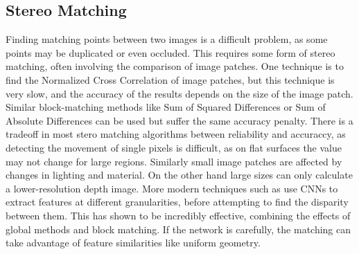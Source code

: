 \documentclass[ %
                    author={Gavin Parker},
                supervisor={Dr. Neill Campbell},
                    degree={MEng},
                     title={Deep Siamese Networks for Illumination Estimation from Stereo Images},
                  subtitle={},
                      type={research},
                      year={2018} ]{dissertation}
\begin{document}
\subsection{Stereo Matching}
Finding matching points between two images is a difficult problem, as some points may be duplicated or even occluded. This requires some form of stereo matching, often involving the comparison of image patches. One technique is to find the Normalized Cross Correlation of image patches, but this technique is very slow, and the accuracy of the results depends on the size of the image patch. Similar block-matching methods like Sum of Squared Differences or Sum of Absolute Differences can be used but suffer the same accuracy penalty. There is a tradeoff in most stero matching algorithms between reliability and accuraccy, as detecting the movement of single pixels is difficult, as on flat surfaces the value may not change for large regions. Similarly small image patches are affected by changes in lighting and material. On the other hand large sizes can only calculate a lower-resolution depth image.  More modern techniques such as \cite{7780983} use CNNs to extract features at different granularities, before attempting to find the disparity between them. This has shown to be incredibly effective, combining the effects of global methods and block matching. If the network is carefully, the matching can take advantage of feature similarities like uniform geometry.
\end{document}
